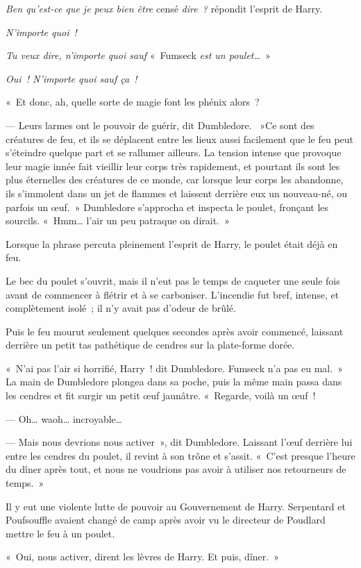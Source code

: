 \emph{Ben qu'est-ce que je peux bien être} censé \emph{dire~?} répondit l'esprit de Harry.

\emph{N'importe quoi~!}

\emph{Tu veux dire, n'importe quoi sauf} «~Fumseck \emph{est un poulet…}~»

\emph{Oui~! N'importe quoi sauf ça~!}

«~Et donc, ah, quelle sorte de magie font les phénix alors~?

--- Leurs larmes ont le pouvoir de guérir, dit Dumbledore. ~»Ce sont des créatures de feu, et ils se déplacent entre les lieux aussi facilement que le feu peut s'éteindre quelque part et se rallumer ailleurs. La tension intense que provoque leur magie innée fait vieillir leur corps très rapidement, et pourtant ils sont les plus éternelles des créatures de ce monde, car lorsque leur corps les abandonne, ils s'immolent dans un jet de flammes et laissent derrière eux un nouveau-né, ou parfois un œuf.~» Dumbledore s'approcha et inspecta le poulet, fronçant les sourcils. «~Hmm… l'air un peu patraque on dirait.~»

Lorsque la phrase percuta pleinement l'esprit de Harry, le poulet était déjà en feu.

Le bec du poulet s'ouvrit, mais il n'eut pas le temps de caqueter une seule fois avant de commencer à flétrir et à se carboniser. L'incendie fut bref, intense, et complètement isolé~; il n'y avait pas d'odeur de brûlé.

Puis le feu mourut seulement quelques secondes après avoir commencé, laissant derrière un petit tas pathétique de cendres sur la plate-forme dorée.

«~N'ai pas l'air si horrifié, Harry~! dit Dumbledore. Fumseck n'a pas eu mal.~» La main de Dumbledore plongea dans sa poche, puis la même main passa dans les cendres et fit surgir un petit œuf jaunâtre. «~Regarde, voilà un œuf~!

--- Oh… waoh… incroyable…

--- Mais nous devrions nous activer~», dit Dumbledore. Laissant l'œuf derrière lui entre les cendres du poulet, il revint à son trône et s'assit. «~C'est presque l'heure du dîner après tout, et nous ne voudrions pas avoir à utiliser nos retourneurs de temps.~»

Il y eut une violente lutte de pouvoir au Gouvernement de Harry. Serpentard et Poufsouffle avaient changé de camp après avoir vu le directeur de Poudlard mettre le feu à un poulet.

«~Oui, nous activer, dirent les lèvres de Harry. Et puis, dîner.~»

